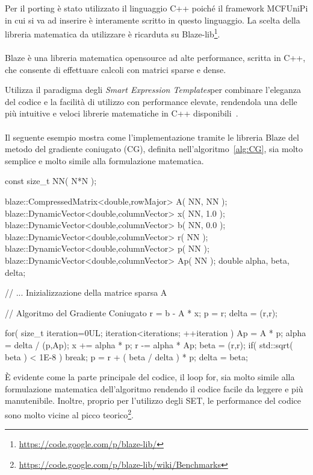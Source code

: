 

Per il porting è stato utilizzato il linguaggio C++ poiché il framework MCFUniPi in cui si va ad inserire è interamente scritto in questo linguaggio.
La scelta della libreria matematica da utilizzare è ricarduta su Blaze-lib\footnote{\url{https://code.google.com/p/blaze-lib/}}.\\
\\
Blaze è una libreria matematica opensource ad alte performance, scritta in C++, che consente di effettuare calcoli con matrici sparse e dense.

Utilizza il paradigma degli \emph{Smart Expression Templates}per combinare l'eleganza del codice e la facilità di utilizzo con performance elevate, rendendola una delle più intuitive e veloci librerie matematiche in C++ disponibili~\cite{blaze_SET}.\\
\\
Il seguente esempio mostra come l'implementazione tramite le libreria Blaze del metodo del gradiente coniugato (CG), definita nell'algoritmo~\vref{alg:CG}, sia molto semplice e molto simile alla formulazione matematica.
\begin{codice}[]
const size_t NN( N*N );

blaze::CompressedMatrix<double,rowMajor> A( NN, NN );
blaze::DynamicVector<double,columnVector> x( NN, 1.0 );
blaze::DynamicVector<double,columnVector> b( NN, 0.0 );
blaze::DynamicVector<double,columnVector> r( NN );
blaze::DynamicVector<double,columnVector> p( NN );
blaze::DynamicVector<double,columnVector> Ap( NN );
double alpha, beta, delta;

// ... Inizializzazione della matrice sparsa A

// Algoritmo del Gradiente Coniugato
r = b - A * x;
p = r;
delta = (r,r);

for( size_t iteration=0UL; iteration<iterations; ++iteration )
{
   Ap = A * p;
   alpha = delta / (p,Ap);
   x += alpha * p;
   r -= alpha * Ap;
   beta = (r,r);
   if( std::sqrt( beta ) < 1E-8 ) break;
   p = r + ( beta / delta ) * p;  
   delta = beta;
}
\end{codice}

È evidente come la parte principale del codice, il loop for, sia molto simile alla formulazione matematica dell'algoritmo rendendo il codice facile da leggere e più manutenibile. Inoltre, proprio per l'utilizzo degli SET, le performance del codice sono molto vicine al picco teorico\footnote{\url{https://code.google.com/p/blaze-lib/wiki/Benchmarks}}.


